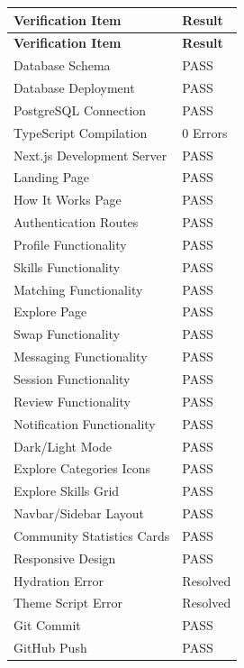 \documentclass[12pt,a4paper]{report}
\begin{document}
\begin{longtable}{@{} l l @{}}
\toprule
\textbf{Verification Item} & \textbf{Result} \\
\midrule
\endfirsthead
\toprule
\textbf{Verification Item} & \textbf{Result} \\
\midrule
\endhead
Database Schema                & PASS \\
Database Deployment            & PASS \\
PostgreSQL Connection          & PASS \\
TypeScript Compilation         & 0 Errors \\
Next.js Development Server     & PASS \\
Landing Page                   & PASS \\
How It Works Page              & PASS \\
Authentication Routes          & PASS \\
Profile Functionality          & PASS \\
Skills Functionality           & PASS \\
Matching Functionality         & PASS \\
Explore Page                   & PASS \\
Swap Functionality             & PASS \\
Messaging Functionality        & PASS \\
Session Functionality          & PASS \\
Review Functionality           & PASS \\
Notification Functionality     & PASS \\
Dark/Light Mode                & PASS \\
Explore Categories Icons       & PASS \\
Explore Skills Grid            & PASS \\
Navbar/Sidebar Layout          & PASS \\
Community Statistics Cards     & PASS \\
Responsive Design              & PASS \\
Hydration Error                & Resolved \\
Theme Script Error             & Resolved \\
Git Commit                     & PASS \\
GitHub Push                    & PASS \\
\bottomrule
\end{longtable}
\end{document}
